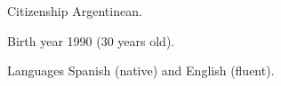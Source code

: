 
\begin{cvskills}

	\cvskill
	{Citizenship}
    {Argentinean.}

	\cvskill
	{Birth year}
    {1990 (30 years old).}

	\cvskill
	{Languages}
    {Spanish (native) and English (fluent).}

\end{cvskills}
